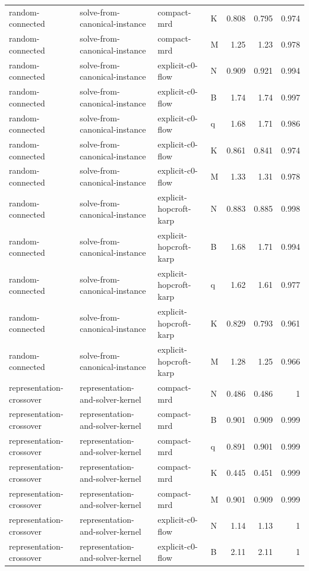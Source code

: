 \begin{table}[t]
\begin{tabular}{llllrrr}
random-connected & solve-from-canonical-instance & compact-mrd & K & 0.808 & 0.795 & 0.974 \\
random-connected & solve-from-canonical-instance & compact-mrd & M & 1.25 & 1.23 & 0.978 \\
random-connected & solve-from-canonical-instance & explicit-c0-flow & N & 0.909 & 0.921 & 0.994 \\
random-connected & solve-from-canonical-instance & explicit-c0-flow & B & 1.74 & 1.74 & 0.997 \\
random-connected & solve-from-canonical-instance & explicit-c0-flow & q & 1.68 & 1.71 & 0.986 \\
random-connected & solve-from-canonical-instance & explicit-c0-flow & K & 0.861 & 0.841 & 0.974 \\
random-connected & solve-from-canonical-instance & explicit-c0-flow & M & 1.33 & 1.31 & 0.978 \\
random-connected & solve-from-canonical-instance & explicit-hopcroft-karp & N & 0.883 & 0.885 & 0.998 \\
random-connected & solve-from-canonical-instance & explicit-hopcroft-karp & B & 1.68 & 1.71 & 0.994 \\
random-connected & solve-from-canonical-instance & explicit-hopcroft-karp & q & 1.62 & 1.61 & 0.977 \\
random-connected & solve-from-canonical-instance & explicit-hopcroft-karp & K & 0.829 & 0.793 & 0.961 \\
random-connected & solve-from-canonical-instance & explicit-hopcroft-karp & M & 1.28 & 1.25 & 0.966 \\
representation-crossover & representation-and-solver-kernel & compact-mrd & N & 0.486 & 0.486 & 1 \\
representation-crossover & representation-and-solver-kernel & compact-mrd & B & 0.901 & 0.909 & 0.999 \\
representation-crossover & representation-and-solver-kernel & compact-mrd & q & 0.891 & 0.901 & 0.999 \\
representation-crossover & representation-and-solver-kernel & compact-mrd & K & 0.445 & 0.451 & 0.999 \\
representation-crossover & representation-and-solver-kernel & compact-mrd & M & 0.901 & 0.909 & 0.999 \\
representation-crossover & representation-and-solver-kernel & explicit-c0-flow & N & 1.14 & 1.13 & 1 \\
representation-crossover & representation-and-solver-kernel & explicit-c0-flow & B & 2.11 & 2.11 & 1 \\

\end{tabular}
\end{table}
